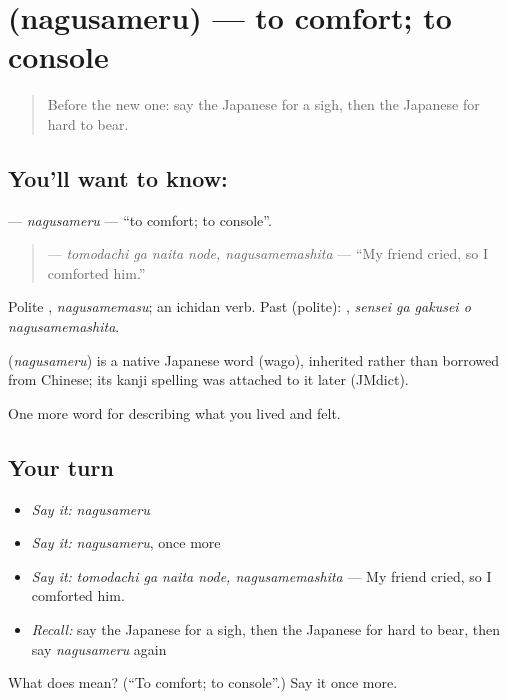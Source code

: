 \section[\texorpdfstring{\ja{なぐさめる} (nagusameru)}{なぐさめる (nagusameru)}]{ (nagusameru) — to comfort; to console}

\label{lesson:JA-C429-nagusameru}



\begin{quote}
Before the new one: say the Japanese for a sigh, then the Japanese for hard to bear.
\end{quote}

\subsection*{You'll want to know: }
\textbf{} — \emph{nagusameru} — \textquotedblleft{}to comfort; to console\textquotedblright{}.

\begin{quote}
\textbf{ } — \emph{tomodachi ga naita node, nagusamemashita} — \textquotedblleft{}My friend cried, so I comforted him.\textquotedblright{}
\end{quote}

Polite \textbf{}, \emph{nagusamemasu}; an ichidan verb. Past (polite): \textbf{  }, \emph{sensei ga gakusei o nagusamemashita}.

\begin{cousinweb}
\textbf{} (\emph{nagusameru}) is a native Japanese word (wago), inherited rather than borrowed from Chinese; its kanji spelling was attached to it later (JMdict).
\end{cousinweb}

\begin{grammarlens}[title={What you've built}]
One more word for describing what you lived and felt.
\end{grammarlens}

\subsection*{Your turn}
\begin{itemize}
\raggedright
  \item \emph{Say it:} \emph{nagusameru}
  \item \emph{Say it:} \emph{nagusameru}, once more
  \item \emph{Say it:} \emph{tomodachi ga naita node, nagusamemashita} — My friend cried, so I comforted him.
  \item \emph{Recall:} say the Japanese for a sigh, then the Japanese for hard to bear, then say \emph{nagusameru} again
\end{itemize}

\begin{tcolorbox}[breakable,colback=teal!4,colframe=teal!35!black,title={Before you move on}]
What does  mean? (\textquotedblleft{}To comfort; to console\textquotedblright{}.) Say it once more.
\end{tcolorbox}
